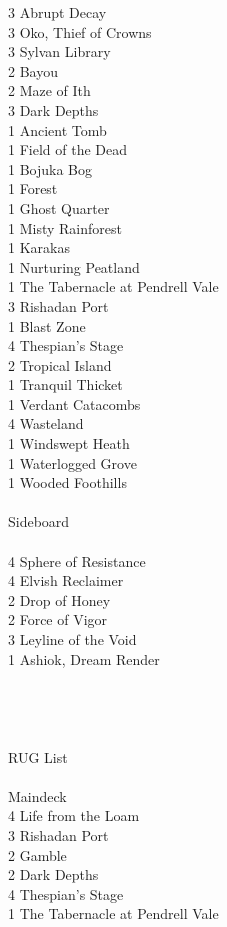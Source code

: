 \documentclass{report}
\begin{document}
3 Abrupt Decay\\
3 Oko, Thief of Crowns\\
3 Sylvan Library\\
2 Bayou\\
2 Maze of Ith\\
3 Dark Depths\\
1 Ancient Tomb\\
1 Field of the Dead\\
1 Bojuka Bog\\
1 Forest\\
1 Ghost Quarter\\
1 Misty Rainforest\\
1 Karakas\\
1 Nurturing Peatland\\
1 The Tabernacle at Pendrell Vale\\
3 Rishadan Port\\
1 Blast Zone\\
4 Thespian's Stage\\
2 Tropical Island\\
1 Tranquil Thicket\\
1 Verdant Catacombs\\
4 Wasteland\\
1 Windswept Heath\\
1 Waterlogged Grove\\
1 Wooded Foothills\\\\
Sideboard\\\\
4 Sphere of Resistance\\
4 Elvish Reclaimer\\
2 Drop of Honey\\
2 Force of Vigor\\
3 Leyline of the Void\\
1 Ashiok, Dream Render\\\\\\\\\\
RUG List\\\\
Maindeck\\
4 Life from the Loam\\
3 Rishadan Port\\
2 Gamble\\
2 Dark Depths\\
4 Thespian's Stage\\
1 The Tabernacle at Pendrell Vale\\
\end{document}
